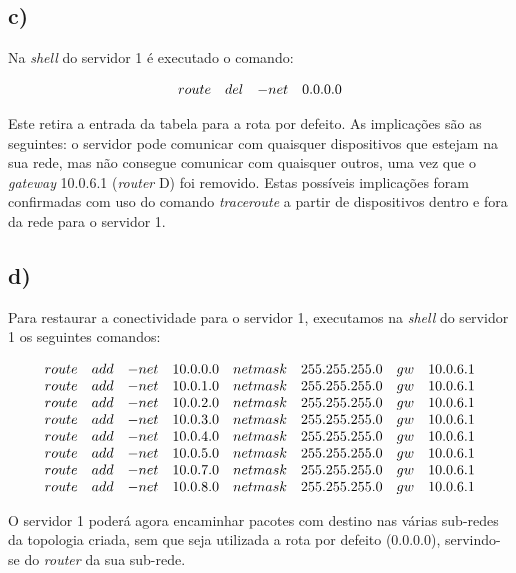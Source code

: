 \documentclass{llncs}
\begin{document}
\subsection*{c)}

Na \textit{shell} do servidor 1 é executado o comando:

\[
\begin{array}{l l l l l l l}
route&del&-net&0.0.0.0
\end{array}
\]

Este retira a entrada da tabela para a rota por defeito. As implicações são as seguintes: o servidor pode comunicar com quaisquer dispositivos que estejam na sua rede, mas não consegue comunicar com quaisquer outros, uma vez que o \textit{gateway} 10.0.6.1 (\textit{router} D) foi removido. Estas possíveis implicações foram confirmadas com uso do comando \textit{traceroute} a partir de dispositivos dentro e fora da rede para o servidor 1.


\newpage

\subsection*{d)}

Para restaurar a conectividade para o servidor 1, executamos na \textit{shell} do servidor 1 os seguintes comandos:

\[
\begin{array}{l l l l l l l l l l l l l l l l}
route&add&-net&10.0.0.0&netmask&255.255.255.0&gw&10.0.6.1 \\
route&add&-net&10.0.1.0&netmask&255.255.255.0&gw&10.0.6.1 \\
route&add&-net&10.0.2.0&netmask&255.255.255.0&gw&10.0.6.1 \\
route&add&-net&10.0.3.0&netmask&255.255.255.0&gw&10.0.6.1 \\
route&add&-net&10.0.4.0&netmask&255.255.255.0&gw&10.0.6.1 \\
route&add&-net&10.0.5.0&netmask&255.255.255.0&gw&10.0.6.1 \\
route&add&-net&10.0.7.0&netmask&255.255.255.0&gw&10.0.6.1 \\
route&add&-net&10.0.8.0&netmask&255.255.255.0&gw&10.0.6.1
\end{array}
\]

O servidor 1 poderá agora encaminhar pacotes com destino nas várias sub-redes da topologia criada, sem que seja utilizada a rota por defeito (0.0.0.0), servindo-se do \textit{router} da sua sub-rede.
\end{document}
